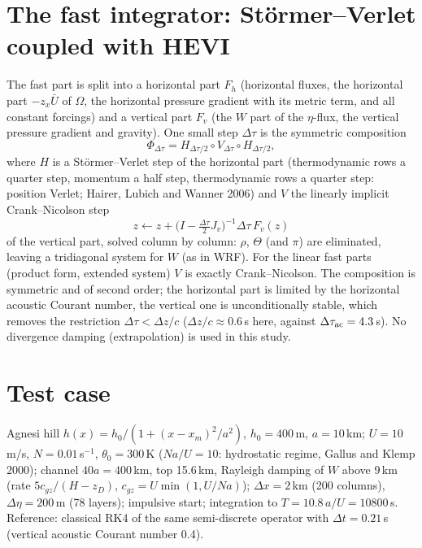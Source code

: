 \documentclass[11pt,a4paper]{article}
\newcommand{\dt}{\Delta t}
\begin{document}
\section{The fast integrator: St\"ormer--Verlet coupled with HEVI}
The fast part is split into a horizontal part $F_h$ (horizontal fluxes, the horizontal part
$-z_x\bar U$ of $\Omega$, the horizontal pressure gradient with its metric term, and all constant
forcings) and a vertical part $F_v$ (the $W$ part of the $\eta$-flux, the vertical pressure gradient
and gravity). One small step $\Delta\tau$ is the symmetric composition
\[
\Phi_{\Delta\tau}=H_{\Delta\tau/2}\circ V_{\Delta\tau}\circ H_{\Delta\tau/2},
\]
where $H$ is a St\"ormer--Verlet step of the horizontal part (thermodynamic rows a quarter step,
momentum a half step, thermodynamic rows a quarter step: position Verlet; Hairer, Lubich and Wanner
2006) and $V$ the linearly implicit Crank--Nicolson step
\[
z\leftarrow z+\Big(I-\tfrac{\Delta\tau}2J_v\Big)^{-1}\Delta\tau\,F_v(z)
\]
of the vertical part, solved column by column: $\rho$, $\Theta$ (and $\pi$) are eliminated, leaving a
tridiagonal system for $W$ (as in WRF). For the linear fast parts (product form, extended system) $V$
is exactly Crank--Nicolson. The composition is symmetric and of second order; the horizontal part
is limited by the horizontal acoustic Courant number, the vertical one is unconditionally stable,
which removes the restriction $\Delta\tau<\Delta z/c$ ($\Delta z/c\approx0.6$\,s here, against
$\Delta\tau_{\rm ac}=4.3$\,s). No divergence damping (extrapolation) is used in this study.

\section{Test case}
Agnesi hill $h(x)=h_0/(1+(x-x_m)^2/a^2)$, $h_0=400$\,m, $a=10$\,km; $U=10$\,m/s, $N=0.01$\,s$^{-1}$,
$\theta_0=300$\,K ($Na/U=10$: hydrostatic regime, Gallus and Klemp 2000); channel $40a=400$\,km, top
15.6\,km, Rayleigh damping of $W$ above 9\,km (rate $5c_{gz}/(H-z_D)$, $c_{gz}=U\min(1,U/Na)$);
$\Delta x=2$\,km (200 columns), $\Delta\eta=200$\,m (78 layers); impulsive start; integration to
$T=10.8\,a/U=10800$\,s. Reference: classical RK4 of the same semi-discrete operator with
$\dt=0.21$\,s (vertical acoustic Courant number 0.4).
\end{document}
